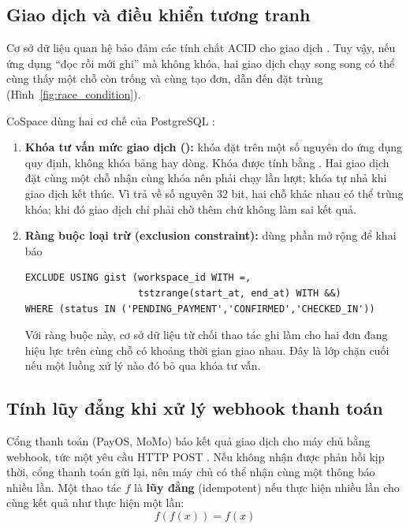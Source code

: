 \subsection{Giao dịch và điều khiển tương tranh}
Cơ sở dữ liệu quan hệ bảo đảm các tính chất ACID cho giao dịch \cite{kleppmann2017ddia}. Tuy vậy, nếu ứng dụng ``đọc rồi mới ghi'' mà không khóa, hai giao dịch chạy song song có thể cùng thấy một chỗ còn trống và cùng tạo đơn, dẫn đến đặt trùng (Hình~\ref{fig:race_condition}).


CoSpace dùng hai cơ chế của PostgreSQL \cite{postgresql_documentation}:
\begin{enumerate}
    \item \textbf{Khóa tư vấn mức giao dịch ():} khóa đặt trên một số nguyên do ứng dụng quy định, không khóa bảng hay dòng. Khóa được tính bằng . Hai giao dịch đặt cùng một chỗ nhận cùng khóa nên phải chạy lần lượt; khóa tự nhả khi giao dịch kết thúc. Vì  trả về số nguyên 32 bit, hai chỗ khác nhau có thể trùng khóa; khi đó giao dịch chỉ phải chờ thêm chứ không làm sai kết quả.
    \item \textbf{Ràng buộc loại trừ (exclusion constraint):} dùng phần mở rộng  để khai báo
\begin{verbatim}
EXCLUDE USING gist (workspace_id WITH =,
                    tstzrange(start_at, end_at) WITH &&)
WHERE (status IN ('PENDING_PAYMENT','CONFIRMED','CHECKED_IN'))
\end{verbatim}
    Với ràng buộc này, cơ sở dữ liệu từ chối thao tác ghi làm cho hai đơn đang hiệu lực trên cùng chỗ có khoảng thời gian giao nhau. Đây là lớp chặn cuối nếu một luồng xử lý nào đó bỏ qua khóa tư vấn.
\end{enumerate}

\subsection{Tính lũy đẳng khi xử lý webhook thanh toán}
Cổng thanh toán (PayOS, MoMo) báo kết quả giao dịch cho máy chủ bằng webhook, tức một yêu cầu HTTP POST \cite{payos_docs}. Nếu không nhận được phản hồi kịp thời, cổng thanh toán gửi lại, nên máy chủ có thể nhận cùng một thông báo nhiều lần. Một thao tác $f$ là \textbf{lũy đẳng} (idempotent) nếu thực hiện nhiều lần cho cùng kết quả như thực hiện một lần:
\begin{equation}
    f(f(x)) = f(x)
    \label{eq:idempotency}
\end{equation}

